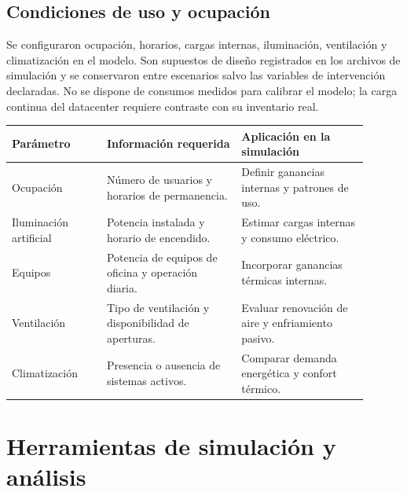 \subsection{Condiciones de uso y ocupación}

\noindent
\begin{minipage}[t]{\textwidth}
\vspace{0pt}
\rmfamily\fontsize{12}{18}\selectfont
Se configuraron ocupación, horarios, cargas internas, iluminación, ventilación y climatización en el modelo. Son supuestos de diseño registrados en los archivos de simulación y se conservaron entre escenarios salvo las variables de intervención declaradas. No se dispone de consumos medidos para calibrar el modelo; la carga continua del datacenter requiere contraste con su inventario real.
\end{minipage}\par\vspace{0.5cm}
\noindent\begin{minipage}[t]{\textwidth}
\vspace{0pt}
  {\fontsize{8.4}{10.2}\selectfont
  \begin{tabular}{p{0.24\linewidth}p{0.34\linewidth}p{0.32\linewidth}}
    \toprule
    Parámetro & Información requerida & Aplicación en la simulación \\
    \midrule
    Ocupación & Número de usuarios y horarios de permanencia. & Definir ganancias internas y patrones de uso. \\
    Iluminación artificial & Potencia instalada y horario de encendido. & Estimar cargas internas y consumo eléctrico. \\
    Equipos & Potencia de equipos de oficina y operación diaria. & Incorporar ganancias térmicas internas. \\
    Ventilación & Tipo de ventilación y disponibilidad de aperturas. & Evaluar renovación de aire y enfriamiento pasivo. \\
    Climatización & Presencia o ausencia de sistemas activos. & Comparar demanda energética y confort térmico. \\
    \bottomrule
  \end{tabular}
  }
\end{minipage}

\par\medskip

\section{Herramientas de simulación y análisis}

